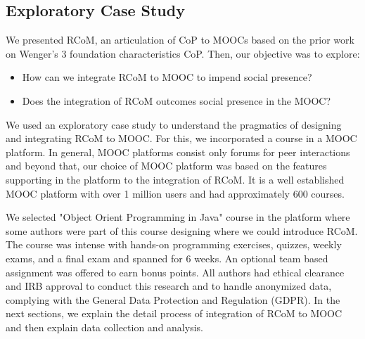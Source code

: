 \documentclass[format=acmsmall, review=false, screen=true]{acmart}
\newcommand{\msb}[1]{{\textcolor{blue}{ [Michael: #1]}}}
\begin{document}


\subsection{Exploratory Case Study}
We presented RCoM, an articulation of CoP to MOOCs based on the prior work on Wenger's 3 foundation characteristics CoP. Then, our objective was to explore:  
\begin{itemize}
    \item How can we integrate RCoM to MOOC to impend social presence? 
    \item Does the integration of RCoM outcomes social presence in the MOOC? 
\end{itemize}
We used an exploratory case study to understand the pragmatics of designing and integrating RCoM to MOOC. For this, we incorporated a course in a MOOC platform. In general, MOOC platforms consist only forums for peer interactions and beyond that, our choice of MOOC platform was based on the features supporting in the platform to the integration of RCoM. It is a well established MOOC platform with over 1 million users and had approximately 600 courses. 

We selected "Object Orient Programming in Java" course in the platform where some authors were part of this course designing where we could introduce RCoM. The course was intense with hands-on programming exercises, quizzes, weekly exams, and a final exam and spanned for 6 weeks. An optional team based assignment was offered to earn bonus points. All authors had ethical clearance and IRB approval to conduct this research and to handle anonymized data, complying with the General Data Protection and Regulation (GDPR). In the next sections, we explain the detail process of integration of RCoM to MOOC and then explain data collection and analysis. 
\end{document}
